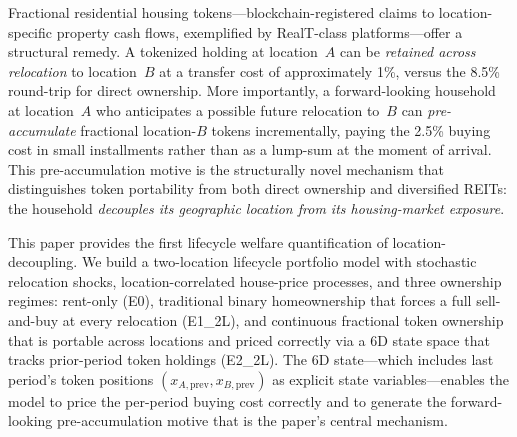 Fractional residential housing tokens---blockchain-registered claims to
location-specific property cash flows, exemplified by RealT-class
platforms---offer a structural remedy.
A tokenized holding at location~$A$ can be \emph{retained across
relocation} to location~$B$ at a transfer cost of approximately 1\%,
versus the 8.5\% round-trip for direct ownership.
More importantly, a forward-looking household at location~$A$ who
anticipates a possible future relocation to~$B$ can \emph{pre-accumulate}
fractional location-$B$ tokens incrementally, paying the 2.5\% buying cost
in small installments rather than as a lump-sum at the moment of arrival.
This pre-accumulation motive is the structurally novel mechanism that
distinguishes token portability from both direct ownership and diversified REITs:
the household \emph{decouples its geographic location from its housing-market exposure}.

This paper provides the first lifecycle welfare quantification of
location-decoupling.
We build a two-location lifecycle portfolio model with stochastic relocation
shocks, location-correlated house-price processes, and three ownership regimes:
rent-only (E0), traditional binary homeownership that forces a full sell-and-buy
at every relocation (E1\_2L), and continuous fractional token ownership that
is portable across locations and priced correctly via a 6D state space that
tracks prior-period token holdings (E2\_2L).
The 6D state---which includes last period's token positions $(x_{A,\text{prev}},
x_{B,\text{prev}})$ as explicit state variables---enables the model to price
the per-period buying cost correctly and to generate the forward-looking
pre-accumulation motive that is the paper's central mechanism.


